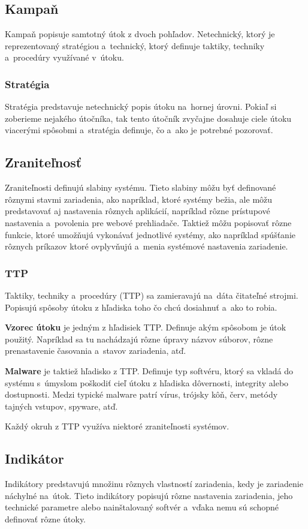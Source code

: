 \documentclass[12pt, a4paper, oneside]{book}
\begin{document}
\subsection{Kampaň}
Kampaň popisuje samtotný útok z dvoch pohľadov. Netechnický, ktorý je reprezentovaný stratégiou a~technický, ktorý definuje taktiky, techniky a~procedúry využívané v~útoku.

\subsubsection{Stratégia}
Stratégia predstavuje netechnický popis útoku na~hornej úrovni. Pokiaľ si zoberieme nejakého útočníka, tak tento útočník zvyčajne dosahuje ciele útoku viacerými spôsobmi a~stratégia definuje, čo a~ako je potrebné pozorovať.

\subsection{Zraniteľnosť}
Zraniteľnosti definujú slabiny systému. Tieto slabiny môžu byť definované rôznymi stavmi zariadenia, ako napríklad, ktoré systémy bežia, ale môžu predstavovať aj nastavenia rôznych aplikácií, napríklad rôzne prístupové nastavenia a~povolenia pre webové prehliadače. Taktiež môžu popisovať rôzne funkcie, ktoré umožňujú vykonávať jednotlivé systémy, ako napríklad spúšťanie rôznych príkazov ktoré ovplyvňujú a~menia systémové nastavenia zariadenie.

\subsubsection{TTP}
Taktiky, techniky a~procedúry (TTP) sa zamieravajú na~dáta čitateľné strojmi. Popisujú spôsoby útoku z hľadiska toho čo chcú dosiahnuť a~ako to robia.


\textbf{Vzorec útoku} je jedným z hľadisiek TTP. Definuje akým spôsobom je útok použitý. Napríklad sa tu nachádzajú rôzne úpravy názvov súborov, rôzne prenastavenie časovania a~stavov zariadenia, atď. 


\textbf{Malware} je taktiež hľadisko z TTP. Definuje typ softvéru, ktorý sa vkladá do systému s~úmyslom poškodiť cieľ útoku z hľadiska dôvernosti, integrity alebo dostupnosti. Medzi typické malware patrí vírus, trójsky kôň, červ, metódy tajných vstupov, spyware, atď.


Každý okruh z TTP využíva niektoré zraniteľnosti systémov.


\subsection{Indikátor}
Indikátory predstavujú množinu rôznych vlastností zariadenia, kedy je zariadenie náchylné na~útok. Tieto indikátory popisujú rôzne nastavenia zariadenia, jeho technické parametre alebo nainštalovaný softvér a~vďaka nemu sú schopné definovať rôzne útoky.
\end{document}
